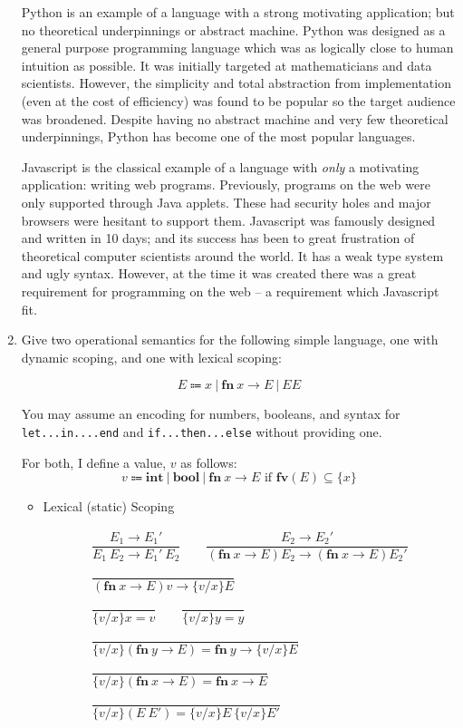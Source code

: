 \documentclass[10pt,\jkfside,a4paper]{article}
\begin{document}
\begin{enumerate}
Python is an example of a language with a strong motivating application; but
no theoretical underpinnings or abstract machine. Python was designed as a
general purpose programming language which was as logically close to human
intuition as possible. It was initially targeted at mathematicians and data
scientists. However, the simplicity and total abstraction from implementation
(even at the cost of efficiency) was found to be popular so the target
audience was broadened. Despite having no abstract machine and very few
theoretical underpinnings, Python has become one of the most popular
languages.

Javascript is the classical example of a language with \textit{only} a
motivating application: writing web programs. Previously, programs on the
web were only supported through Java applets. These had security holes and
major browsers were hesitant to support them. Javascript was famously
designed and written in 10 days; and its success has been to great
frustration of theoretical computer scientists around the world. It has a
weak type system and ugly syntax. However, at the time it was created there
was a great requirement for programming on the web -- a requirement which
Javascript fit.

\item Give two operational semantics for the following simple language, one
with dynamic scoping, and one with lexical scoping:

\[
E \Coloneqq x \ | \ \mathbf{fn}\ x \rightarrow E \ | \ E E
\]

You may assume an encoding for numbers, booleans, and syntax for
\texttt{let...in....end} and \texttt{if...then...else} without providing one.

For both, I define a value, $v$ as follows:
\[
v \Coloneqq \mathbf{int}\ |\ \mathbf{bool}\ |\
\mathbf{fn}\ x \to E \text{ if } \mathbf{fv}(E) \subseteq \{x\}
\]

\begin{itemize}

\newcommand{\env}{\text{Env}}

\item Lexical (static) Scoping

\begin{gather*}
\dfrac{
E_1 \to E_1'
}{
E_1\ E_2 \to E_1'\ E_2
}
\qquad
\dfrac{
E_2 \to E_2'
}{
(\mathbf{fn}\ x \to E)E_2
\to
(\mathbf{fn}\ x \to E)E_2'
}\\\\
\dfrac{
}{
(\mathbf{fn}\ x \to E)v \to \{v/x\}E
}\\\\
\dfrac{}{
\{v/x\}x = v
}
\qquad
\dfrac{
}{
\{v/x\}y = y
}\\\\
\dfrac{
}{
\{v/x\}(\mathbf{fn}\ y \to E) =
\mathbf{fn}\ y \to \{v/x\}E
}\\\\
\dfrac{
}{
\{v/x\}(\mathbf{fn}\ x \to E) =
\mathbf{fn}\ x \to E
}\\\\
\dfrac{}{
\{v/x\}(E\ E') = \{v/x\}E\ \{v/x\}E'
}
\end{gather*}


\end{itemize}
\end{enumerate}
\end{document}

